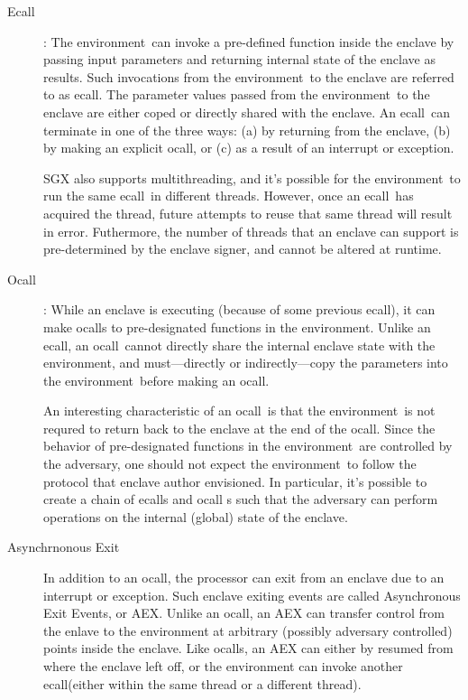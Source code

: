 \documentclass[11pt]{article}
\newcommand{\ecall}{\textsf{ecall}}
\newcommand{\ocall}{\textsf{ocall}}
\newcommand{\env}{\textsf{environment}}
\begin{document}
  \begin{description}
  \item[Ecall]: The \env\ can invoke a pre-defined function inside the
    enclave by passing input parameters and returning internal state
    of the enclave as results. Such invocations from the \env\ to the
    enclave are referred to as \ecall. The parameter values passed
    from the \env\ to the enclave are either coped or directly shared
    with the enclave. An \ecall\ can terminate in one of the three
    ways: (a) by returning from the enclave, (b) by making an explicit
    \ocall, or (c) as a result of an interrupt or exception.

    SGX also supports multithreading, and it's possible for the
    \env\ to run the same \ecall\ in different threads. However, once
    an \ecall\ has acquired the thread, future attempts to reuse that
    same thread will result in error. Futhermore, the number of
    threads that an enclave can support is pre-determined by the
    enclave signer, and cannot be altered at runtime.

  \item [Ocall]: While an enclave is executing (because of some
    previous \ecall), it can make \ocall s  to pre-designated
    functions in the \env.  Unlike an \ecall, an \ocall\ cannot
    directly share the internal enclave state with the \env, and
    must---directly or indirectly---copy the parameters into the
    \env\ before making an \ocall.

    An interesting characteristic of an \ocall\ is that the \env\ is
    not requred to return back to the enclave at the end of the
    \ocall. Since the behavior of pre-designated functions in the
    \env\ are controlled by the adversary, one should not expect the
    \env\ to follow the protocol that enclave author envisioned. In
    particular, it's possible to create a chain of \ecall s and \ocall
    s such that the adversary can perform operations on the internal
    (global) state of the enclave.

  \item[Asynchrnonous Exit] In addition to an \ocall, the
    processor can exit from an enclave due to an interrupt or
    exception. Such enclave exiting events are called Asynchronous
    Exit Events, or AEX. Unlike an \ocall, an AEX can transfer control
    from the enlave to the environment at arbitrary (possibly adversary
    controlled) points inside the enclave. Like \ocall s, an AEX can
    either by resumed from where the enclave left off, or the
    environment can invoke another \ecall (either within the same
    thread or a different thread).
  \end{description}
\end{document}
